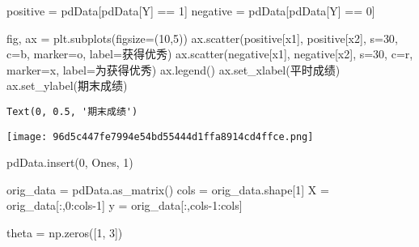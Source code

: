 \documentclass[
]{article}
\newenvironment{Shaded}{}{}
\newcommand{\DecValTok}[1]{\textcolor[rgb]{0.25,0.63,0.44}{#1}}
\newcommand{\NormalTok}[1]{#1}
\newcommand{\OperatorTok}[1]{\textcolor[rgb]{0.40,0.40,0.40}{#1}}
\newcommand{\StringTok}[1]{\textcolor[rgb]{0.25,0.44,0.63}{#1}}
\begin{document}
\begin{Shaded}
\begin{Highlighting}[]
\NormalTok{positive }\OperatorTok{=}\NormalTok{ pdData[pdData[}\StringTok{\textquotesingle{}Y\textquotesingle{}}\NormalTok{] }\OperatorTok{==} \DecValTok{1}\NormalTok{]}
\NormalTok{negative }\OperatorTok{=}\NormalTok{ pdData[pdData[}\StringTok{\textquotesingle{}Y\textquotesingle{}}\NormalTok{] }\OperatorTok{==} \DecValTok{0}\NormalTok{]}

\NormalTok{fig, ax }\OperatorTok{=}\NormalTok{ plt.subplots(figsize}\OperatorTok{=}\NormalTok{(}\DecValTok{10}\NormalTok{,}\DecValTok{5}\NormalTok{))}
\NormalTok{ax.scatter(positive[}\StringTok{\textquotesingle{}x1\textquotesingle{}}\NormalTok{], positive[}\StringTok{\textquotesingle{}x2\textquotesingle{}}\NormalTok{], s}\OperatorTok{=}\DecValTok{30}\NormalTok{, c}\OperatorTok{=}\StringTok{\textquotesingle{}b\textquotesingle{}}\NormalTok{, marker}\OperatorTok{=}\StringTok{\textquotesingle{}o\textquotesingle{}}\NormalTok{, label}\OperatorTok{=}\StringTok{\textquotesingle{}获得优秀\textquotesingle{}}\NormalTok{)}
\NormalTok{ax.scatter(negative[}\StringTok{\textquotesingle{}x1\textquotesingle{}}\NormalTok{], negative[}\StringTok{\textquotesingle{}x2\textquotesingle{}}\NormalTok{], s}\OperatorTok{=}\DecValTok{30}\NormalTok{, c}\OperatorTok{=}\StringTok{\textquotesingle{}r\textquotesingle{}}\NormalTok{, marker}\OperatorTok{=}\StringTok{\textquotesingle{}x\textquotesingle{}}\NormalTok{, label}\OperatorTok{=}\StringTok{\textquotesingle{}为获得优秀\textquotesingle{}}\NormalTok{)}
\NormalTok{ax.legend()}
\NormalTok{ax.set\_xlabel(}\StringTok{\textquotesingle{}平时成绩\textquotesingle{}}\NormalTok{)}
\NormalTok{ax.set\_ylabel(}\StringTok{\textquotesingle{}期末成绩\textquotesingle{}}\NormalTok{)}
\end{Highlighting}
\end{Shaded}

\begin{verbatim}
Text(0, 0.5, '期末成绩')
\end{verbatim}

\texttt{[image: 96d5c447fe7994e54bd55444d1ffa8914cd4ffce.png]}

\begin{Shaded}
\begin{Highlighting}[]

\NormalTok{pdData.insert(}\DecValTok{0}\NormalTok{, }\StringTok{\textquotesingle{}Ones\textquotesingle{}}\NormalTok{, }\DecValTok{1}\NormalTok{) }

\NormalTok{orig\_data }\OperatorTok{=}\NormalTok{ pdData.as\_matrix() }
\NormalTok{cols }\OperatorTok{=}\NormalTok{ orig\_data.shape[}\DecValTok{1}\NormalTok{]}
\NormalTok{X }\OperatorTok{=}\NormalTok{ orig\_data[:,}\DecValTok{0}\NormalTok{:cols}\OperatorTok{{-}}\DecValTok{1}\NormalTok{]}
\NormalTok{y }\OperatorTok{=}\NormalTok{ orig\_data[:,cols}\OperatorTok{{-}}\DecValTok{1}\NormalTok{:cols]}

\NormalTok{theta }\OperatorTok{=}\NormalTok{ np.zeros([}\DecValTok{1}\NormalTok{, }\DecValTok{3}\NormalTok{])}
\end{Highlighting}
\end{Shaded}
\end{document}
